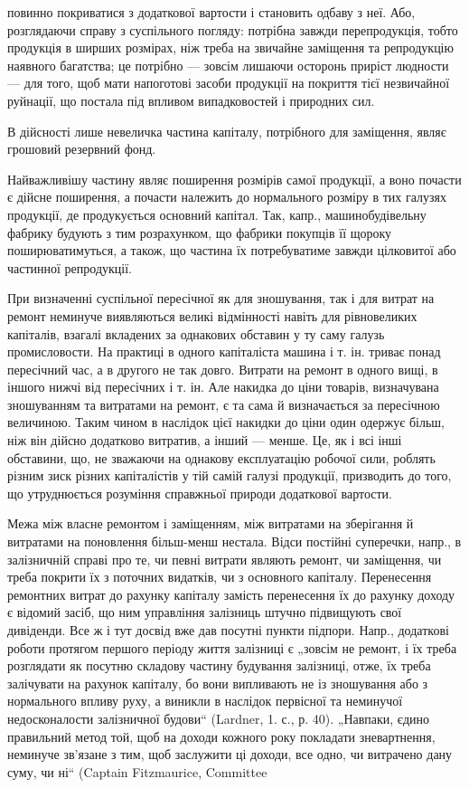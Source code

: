 повинно покриватися з додаткової вартости і становить одбаву з неї. Або, розглядаючи справу з
суспільного погляду: потрібна завжди перепродукція, тобто продукція в ширших розмірах, ніж треба на
звичайне заміщення та репродукцію наявного багатства; це потрібно — зовсім лишаючи осторонь приріст
людности — для того, щоб мати напоготові засоби продукції на покриття тієї незвичайної руйнації, що
постала під впливом випадковостей і природних сил.

В дійсності лише невеличка частина капіталу, потрібного для заміщення, являє грошовий резервний
фонд.

Найважливішу частину являє поширення розмірів самої продукції, а воно почасти є дійсне поширення, а
почасти належить до нормального розміру в тих галузях продукції, де продукується основний капітал.
Так, капр., машинобудівельну фабрику будують з тим розрахунком, що фабрики покупців її щороку
поширюватимуться, а також, що частина їх потребуватиме завжди цілковитої або частинної репродукції.

При визначенні суспільної пересічної як для зношування, так і для витрат на ремонт неминуче
виявляються великі відмінності навіть для рівновеликих капіталів, взагалі вкладених за однакових
обставин у ту саму галузь промисловости. На практиці в одного капіталіста машина і т. ін. триває
понад пересічний час, а в другого не так довго. Витрати на ремонт в одного вищі, в іншого нижчі від
пересічних і т. ін. Але накидка до ціни товарів, визначувана зношуванням та витратами на ремонт, є
та сама й визначається за пересічною величиною. Таким чином в наслідок цієї накидки до ціни один
одержує більш, ніж він дійсно додатково витратив, а інший — менше. Це, як і всі інші обставини, що,
не зважаючи на однакову експлуатацію робочої сили, роблять різним зиск різних капіталістів у тій
самій галузі продукції, призводить до того, що утруднюється розуміння справжньої природи додаткової
вартости.

Межа між власне ремонтом і заміщенням, між витратами на зберігання й витратами на поновлення
більш-менш нестала. Відси постійні суперечки, напр., в залізничній справі про те, чи певні витрати
являють ремонт, чи заміщення, чи треба покрити їх з поточних видатків, чи з основного капіталу.
Перенесення ремонтних витрат до рахунку капіталу замість перенесення їх до рахунку доходу є відомий
засіб, що ним управління залізниць штучно підвищують свої дивіденди. Все ж і тут досвід вже дав
посутні пункти підпори. Напр., додаткові роботи протягом першого періоду життя залізниці є „зовсім
не ремонт, і їх треба розглядати як посутню складову частину будування залізниці, отже, їх треба
залічувати на рахунок капіталу, бо вони випливають не із зношування або з нормального впливу руху, а
виникли в наслідок первісної та неминучої недосконалости залізничної будови“ (Lardner, 1. с., р.
40). „Навпаки, єдино правильний метод той, щоб на доходи кожного року покладати зневартнення,
неминуче зв’язане з тим, щоб заслужити ці доходи, все одно, чи витрачено дану суму, чи ні“ (Captain
Fitzmaurice, Committee
